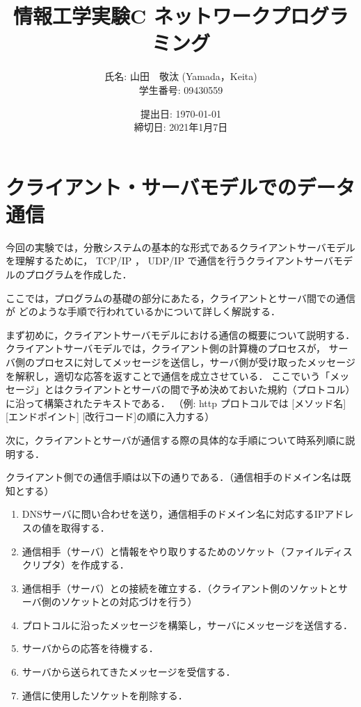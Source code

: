 \documentclass[11pt]{jsarticle}
\begin{document}
\title{情報工学実験C ネットワークプログラミング}
\author{
氏名: 山田　敬汰 (Yamada，Keita) \\
学生番号: 09430559
}
\date{提出日: \today \\   
      締切日: 2021年1月7日 \\}  
\maketitle

\section{クライアント・サーバモデルでのデータ通信}

今回の実験では，分散システムの基本的な形式であるクライアントサーバモデルを理解するために，
TCP/IP ， UDP/IP で通信を行うクライアントサーバモデルのプログラムを作成した．

ここでは，プログラムの基礎の部分にあたる，クライアントとサーバ間での通信が
どのような手順で行われているかについて詳しく解説する．

まず初めに，クライアントサーバモデルにおける通信の概要について説明する．クライアントサーバモデルでは，クライアント側の計算機のプロセスが，
サーバ側のプロセスに対してメッセージを送信し，サーバ側が受け取ったメッセージを解釈し，適切な応答を返すことで通信を成立させている．
ここでいう「メッセージ」とはクライアントとサーバの間で予め決めておいた規約（プロトコル）に沿って構築されたテキストである．
（例: http プロトコルでは [メソッド名] [エンドポイント] [改行コード]の順に入力する）

次に，クライアントとサーバが通信する際の具体的な手順について時系列順に説明する．

クライアント側での通信手順は以下の通りである．（通信相手のドメイン名は既知とする）

\begin{enumerate}
      \item DNSサーバに問い合わせを送り，通信相手のドメイン名に対応するIPアドレスの値を取得する．
      \item 通信相手（サーバ）と情報をやり取りするためのソケット（ファイルディスクリプタ）を作成する．
      \item 通信相手（サーバ）との接続を確立する．（クライアント側のソケットとサーバ側のソケットとの対応づけを行う）
      \item プロトコルに沿ったメッセージを構築し，サーバにメッセージを送信する．
      \item サーバからの応答を待機する．
      \item サーバから送られてきたメッセージを受信する．
      \item 通信に使用したソケットを削除する．
\end{enumerate}
\end{document}

